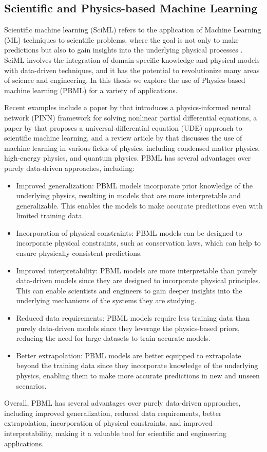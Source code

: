 \subsection{Scientific and Physics-based Machine Learning}

Scientific machine learning (SciML) refers to the application of Machine Learning (ML) techniques to scientific problems, where the goal is not only to make predictions but also to gain insights into the underlying physical processes \cite{raissi2019physics, rackauckas2020universal, carleo2019machine}. SciML involves the integration of domain-specific knowledge and physical models with data-driven techniques, and it has the potential to revolutionize many areas of science and engineering. In this thesis we explore the use of Physics-based machine learning (PBML) \cite{Raissi2021, Wu2021} for a variety of applications.

Recent examples include a paper by \cite{raissi2019physics} that introduces a physics-informed neural network (PINN) framework for solving nonlinear partial differential equations, a paper by \cite{rackauckas2020universal} that proposes a universal differential equation (UDE) approach to scientific machine learning, and a review article by \cite{carleo2019machine} that discusses the use of machine learning in various fields of physics, including condensed matter physics, high-energy physics, and quantum physics. PBML has several advantages over purely data-driven approaches, including:

\begin{itemize}
\item Improved generalization: PBML models incorporate prior knowledge of the underlying physics, resulting in models that are more interpretable and generalizable. This enables the models to make accurate predictions even with limited training data.
\item Incorporation of physical constraints: PBML models can be designed to incorporate physical constraints, such as conservation laws, which can help to ensure physically consistent predictions.
\item Improved interpretability: PBML models are more interpretable than purely data-driven models since they are designed to incorporate physical principles. This can enable scientists and engineers to gain deeper insights into the underlying mechanisms of the systems they are studying.
\item Reduced data requirements: PBML models require less training data than purely data-driven models since they leverage the physics-based priors, reducing the need for large datasets to train accurate models.
\item Better extrapolation: PBML models are better equipped to extrapolate beyond the training data since they incorporate knowledge of the underlying physics, enabling them to make more accurate predictions in new and unseen scenarios.
\end{itemize}

Overall, PBML has several advantages over purely data-driven approaches, including improved generalization, reduced data requirements, better extrapolation, incorporation of physical constraints, and improved interpretability, making it a valuable tool for scientific and engineering applications.
